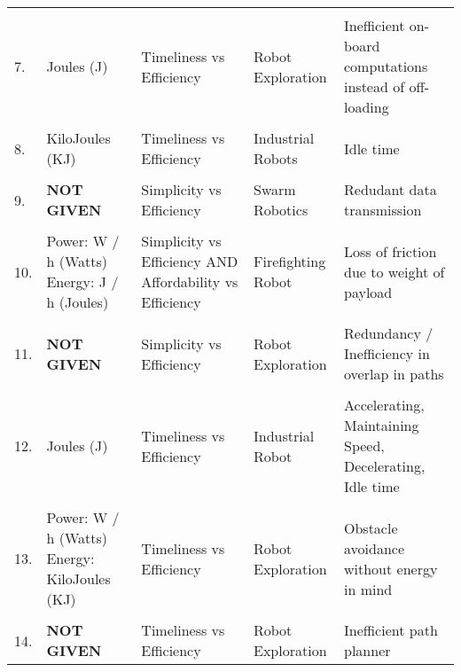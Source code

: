 \begin{table}[h]
\begin{tabular}{p{0.1cm}p{3cm}p{4cm}p{4cm}p{4cm}}
            \hline
            \\
            {7.} &
                {Joules (J)} &
                {Timeliness vs Efficiency} &
                {Robot Exploration} &
                {Inefficient on-board computations instead of off-loading} \\
            \hline
            \\
            {8.} &
                {KiloJoules (KJ)} &
                {Timeliness vs Efficiency} &
                {Industrial Robots} &
                {Idle time} \\
            \hline
            \\
            {9.} &
                {\textbf{NOT GIVEN}} &
                {Simplicity vs Efficiency} &
                {Swarm Robotics} &
                {Redudant data transmission} \\
            \hline
            \\
            {10.} &
                {Power: W / h (Watts)
                Energy: J / h (Joules)} &
                {Simplicity vs Efficiency AND
                Affordability vs Efficiency} &
                {Firefighting Robot} &
                {Loss of friction due to weight of payload} \\
            \hline
            \\
            {11.} &
                {\textbf{NOT GIVEN}} &
                {Simplicity vs Efficiency} &
                {Robot Exploration} &
                {Redundancy / Inefficiency in overlap in paths} \\
            \hline
            \\
            {12.} &
                {Joules (J)} &
                {Timeliness vs Efficiency} &
                {Industrial Robot} &
                {Accelerating, Maintaining Speed, Decelerating, Idle time} \\
            \hline
            \\
            {13.} &
                {Power: W / h (Watts)
                Energy: KiloJoules (KJ)} &
                {Timeliness vs Efficiency} &
                {Robot Exploration} &
                {Obstacle avoidance without energy in mind} \\
            \hline
            \\
            {14.} &
                {\textbf{NOT GIVEN}} &
                {Timeliness vs Efficiency} &
                {Robot Exploration} &
                {Inefficient path planner} \\

\end{tabular}
\end{table}
